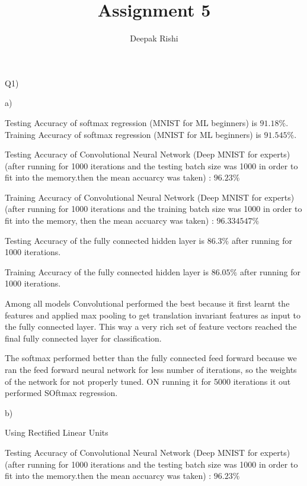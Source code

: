 \documentclass[]{article}
\title{Assignment 5}
\author{Deepak Rishi}
\begin{document}
\maketitle

Q1)

a)

Testing Accuracy of softmax regression (MNIST for ML beginners) is $91.18 \%$.
Training  Accuracy of softmax regression (MNIST for ML beginners) is $91.545 \%$.
\bigskip

Testing Accuracy of Convolutional Neural Network (Deep MNIST for experts) (after running for 1000 iterations and the testing batch size was 1000 in order to fit into the memory.then the mean accuarcy was taken) : $96.23\%$

\bigskip

Training Accuracy of Convolutional Neural Network (Deep MNIST for experts) (after running for 1000 iterations and the training batch size was 1000 in order to fit into the memory, then the mean accuarcy was taken) : $96.334547\%$

\bigskip

Testing Accuracy of the fully connected hidden layer is $86.3\%$ after running for 1000 iterations.

Training Accuracy of the fully connected hidden layer is $86.05\%$ after running for 1000 iterations.


Among all models Convolutional performed the best because it  first learnt the features  and applied max pooling to get translation invariant features as input to the fully connected layer.
This way a very rich set of feature vectors reached the final fully connected layer for classification.

\bigskip

The softmax performed better than the fully connected feed forward because we ran the feed forward neural network for less number of iterations, so the weights of the network for not properly tuned. ON running it for 5000 iterations it out performed SOftmax regression.

\bigskip

b)
\bigskip


Using Rectified Linear Units 

Testing Accuracy of Convolutional Neural Network (Deep MNIST for experts) (after running for 1000 iterations and the testing batch size was 1000 in order to fit into the memory.then the mean accuarcy was taken) : $96.23\%$

\bigskip
\end{document}
